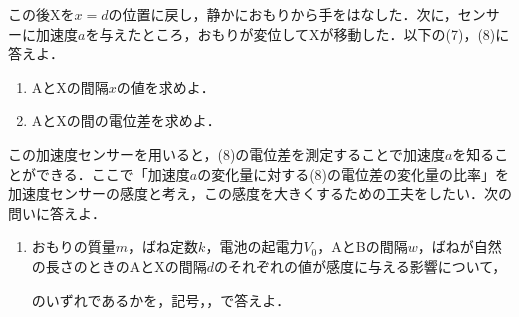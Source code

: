 この後Xを$x = d$の位置に戻し，静かにおもりから手をはなした．次に，センサーに加速度$a$を与えたところ，おもりが変位してXが移動した．以下の(7)，(8)に答えよ．
\begin{enumerate}[(1), resume]
  \item AとXの間隔$x$の値を求めよ．
  \item AとXの間の電位差を求めよ．
\end{enumerate}

この加速度センサーを用いると，(8)の電位差を測定することで加速度$a$を知ることができる．ここで「加速度$a$の変化量に対する(8)の電位差の変化量の比率」を加速度センサーの感度と考え，この感度を大きくするための工夫をしたい．次の問いに答えよ．
\begin{enumerate}[(1), resume]
  \item おもりの質量$m$，ばね定数$k$，電池の起電力$V_0$，AとBの間隔$w$，ばねが自然の長さのときのAとXの間隔$d$のそれぞれの値が感度に与える影響について，\\

    のいずれであるかを，記号，，で答えよ．
\end{enumerate}




